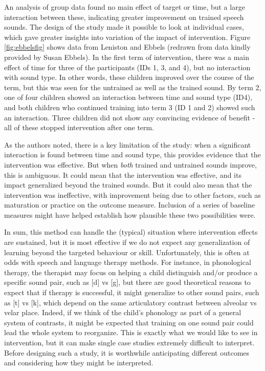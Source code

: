 \documentclass{krantz}
\begin{document}
An analysis of group data found no main effect of target or time, but a large interaction between these, indicating greater improvement on trained speech sounds. The design of the study made it possible to look at individual cases, which gave greater insights into variation of the impact of intervention. Figure \ref{fig:ebbelsfig} shows data from Leniston and Ebbels (redrawn from data kindly provided by Susan Ebbels). In the first term of intervention, there was a main effect of time for three of the participants (IDs 1, 3, and 4), but no interaction with sound type. In other words, these children improved over the course of the term, but this was seen for the untrained as well as the trained sound. By term 2, one of four children showed an interaction between time and sound type (ID4), and both children who continued training into term 3 (ID 1 and 2) showed such an interaction. Three children did not show any convincing evidence of benefit - all of these stopped intervention after one term.

As the authors noted, there is a key limitation of the study: when a significant interaction is found between time and sound type, this provides evidence that the intervention was effective. But when \emph{both} trained and untrained sounds improve, this is ambiguous. It could mean that the intervention was effective, and its impact generalized beyond the trained sounds. But it could also mean that the intervention was ineffective, with improvement being due to other factors, such as maturation or practice on the outcome measure. Inclusion of a series of baseline measures might have helped establish how plausible these two possibilities were.

In sum, this method can handle the (typical) situation where intervention effects are sustained, but it is most effective if we do not expect any generalization of learning beyond the targeted behaviour or skill. Unfortunately, this is often at odds with speech and language therapy methods. For instance, in phonological therapy, the therapist may focus on helping a child distinguish and/or produce a specific sound pair, such as {[}d{]} vs {[}g{]}, but there are good theoretical reasons to expect that if therapy is successful, it might generalize to other sound pairs, such as {[}t{]} vs {[}k{]}, which depend on the same articulatory contrast between alveolar vs velar place. Indeed, if we think of the child's phonology as part of a general system of contrasts, it might be expected that training on one sound pair could lead the whole system to reorganize. This is exactly what we would like to see in intervention, but it can make single case studies extremely difficult to interpret. Before designing such a study, it is worthwhile anticipating different outcomes and considering how they might be interpreted.
\end{document}
